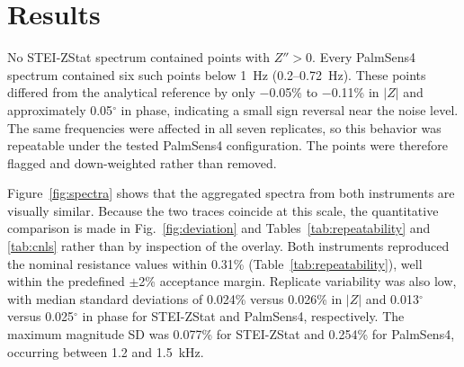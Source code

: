 \section{Results}
No STEI-ZStat spectrum contained points with $Z'' > 0$. Every PalmSens4 spectrum contained six such points below 1~Hz (0.2--0.72~Hz). These points differed from the analytical reference by only $-$0.05\% to $-$0.11\% in $|Z|$ and approximately 0.05$^\circ$ in phase, indicating a small sign reversal near the noise level. The same frequencies were affected in all seven replicates, so this behavior was repeatable under the tested PalmSens4 configuration. The points were therefore flagged and down-weighted rather than removed.

Figure~\ref{fig:spectra} shows that the aggregated spectra from both instruments are visually similar. Because the two traces coincide at this scale, the quantitative comparison is made in Fig.~\ref{fig:deviation} and Tables~\ref{tab:repeatability} and \ref{tab:cnls} rather than by inspection of the overlay. Both instruments reproduced the nominal resistance values within 0.31\% (Table~\ref{tab:repeatability}), well within the predefined $\pm$2\% acceptance margin. Replicate variability was also low, with median standard deviations of 0.024\% versus 0.026\% in $|Z|$ and 0.013$^\circ$ versus 0.025$^\circ$ in phase for STEI-ZStat and PalmSens4, respectively. The maximum magnitude SD was 0.077\% for STEI-ZStat and 0.254\% for PalmSens4, occurring between 1.2 and 1.5~kHz.


\begin{table}[!t]
\renewcommand{\arraystretch}{1.15}
\caption{Repeatability and Passive-Reference Agreement}
\label{tab:repeatability}
\centering
{}
\end{table}

